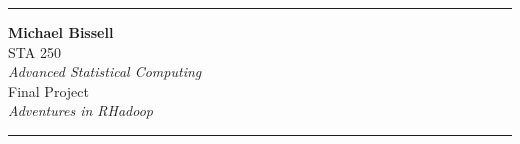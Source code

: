 \documentclass[a4paper, 11pt]{report}
\begin{document}
	\begin{titlepage}
	\vspace*{1.5in}
	\noindent\rule{\textwidth}{1pt}
	\begin{flushright}
		\LARGE \textbf{Michael Bissell} \\ \vspace{0.5in}
		\Large STA 250 \\
		\large \textit{Advanced Statistical Computing} \\ \vspace{0.5in}
		\Large Final Project \\
		\large	\textit{Adventures in RHadoop} 
	\end{flushright}
	\noindent\rule{\textwidth}{1pt}
	\end{titlepage}
	\restoregeometry


	
\end{document}
